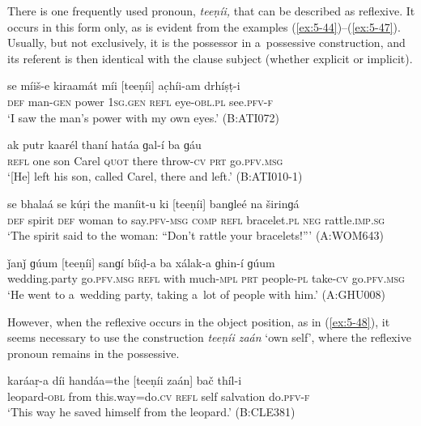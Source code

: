There is one frequently used pronoun, \textit{teeṇíi,} that can be described as reflexive. It
occurs in this form only, as is evident from the examples (\ref{ex:5-44})--(\ref{ex:5-47}). Usually, but not
exclusively, it is the possessor in a~possessive construction, and its referent is then identical
with the clause subject (whether explicit or implicit).

\begin{exe}
\ex
\label{ex:5-44}
\gll se míiš-e kiraamát míi [teeṇíi] ac̣híi-am drhíṣṭ-i\\
\textsc{def} man-\textsc{gen} power \textsc{1sg.gen} \textsc{refl} eye-\textsc{obl.pl} see.\textsc{pfv-f}\\
\glt `I saw the man's power with my own eyes.' (B:ATI072)

\ex
\label{ex:5-45}
\gll [teeṇíi] ak putr kaarél thaní hatáa ɡal-í ba ɡáu \\
\textsc{refl} one son Carel \textsc{quot} there throw-\textsc{cv} \textsc{prt} go.\textsc{pfv.msg}\\
\glt `[He] left his son, called Carel, there and left.' (B:ATI010-1)

\ex
\label{ex:5-46}
\gll se bhalaá se kúṛi the maníit-u ki [teeṇíi] banɡleé na širinɡá\\
\textsc{def} spirit \textsc{def} woman to say.\textsc{pfv-msg} \textsc{comp} \textsc{refl} bracelet.\textsc{pl} \textsc{neg} rattle.\textsc{imp.sg}\\
\glt `The spirit said to the woman: ``Don't rattle your bracelets!''' (A:WOM643)

\ex
\label{ex:5-47}
\gll ǰanǰ ɡúum [teeṇíi] sanɡí bíiḍ-a ba xálak-a ɡhin-í ɡúum\\
wedding.party go.\textsc{pfv.msg } \textsc{refl} with much-\textsc{mpl} \textsc{prt} people-\textsc{pl} take-\textsc{cv} go.\textsc{pfv.msg}\\
\glt `He went to a~wedding party, taking a~lot of people with him.' (A:GHU008)
\end{exe}
However, when the reflexive occurs in the object position, as in (\ref{ex:5-48}), it seems necessary to use the construction \textit{teeṇíi zaán} `own self', where the reflexive pronoun remains in the possessive.
\begin{exe}
\ex
\label{ex:5-48}
\gll karáaṛ-a díi handáa=the [teeṇíi zaán] bač thíl-i\\
leopard-\textsc{obl} from this.way=do.\textsc{cv} \textsc{refl} self salvation do.\textsc{pfv-f}\\
\glt `This way he saved himself from the leopard.' (B:CLE381)
\end{exe}

